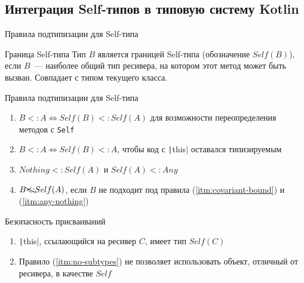 \documentclass[handout,aspectratio=169,usenames,dvipsnames]{beamer}
\begin{document}
    \subsection{Интеграция Self-типов в типовую систему Kotlin}

    \begin{frame}[fragile]{Правила подтипизации для Self-типа}

        \begin{block}{Граница Self-типа}
            Тип $B$ является границей Self-типа (обозначение \underline{$Self(B)$}), если $B$~--- наиболее общий тип ресивера, на котором этот метод может быть вызван.
            Совпадает с типом текущего класса.
        \end{block}

        \pause

        \begin{block}{Правила подтипизации для Self-типа}
            \begin{enumerate}
                \item \label{itm:covariant-bound} $B <: A \iff Self(B) <: Self(A)$ для возможности переопределения методов с \texttt{Self}
                \item \label{itm:this-subtype} $B <: A \iff Self(B) <: A$, чтобы код с \texttt|this| оставался типизируемым
                \item \label{itm:any-nothing} $Nothing <: Self(A)$ и $Self(A) <: Any$
                \item \label{itm:no-subtypes} $B \bcancel{<:} Self(A)$, если $B$ не подходит под правила (\ref{itm:covariant-bound}) и (\ref{itm:any-nothing})
            \end{enumerate}
        \end{block}

        \pause

        \begin{block}{Безопасность присваиваний}
            \begin{enumerate}
                \item \texttt|this|, ссылающийся на ресивер $C$, имеет тип $Self(C)$
                \item Правило (\ref{itm:no-subtypes}) не позволяет использовать объект, отличный от ресивера, в качестве $Self$
            \end{enumerate}
        \end{block}
    \end{frame}
\end{document}
